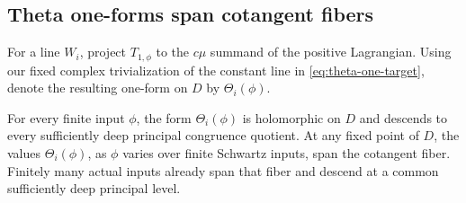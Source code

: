 \subsection{Theta one-forms span cotangent fibers}\label{subsec:theta-one-forms}

For a line \(W_i\), project \(T_{1,\phi}\) to the \(c\mu\)
summand of the positive Lagrangian.  Using our fixed complex
trivialization of the constant line in \eqref{eq:theta-one-target},
denote the resulting one-form on
\(D\) by \(\Theta_i(\phi)\).

\begin{proposition}\label{prop:theta-one}
For every finite input \(\phi\), the form \(\Theta_i(\phi)\) is
holomorphic on \(D\) and descends to every sufficiently deep
principal congruence quotient.  At any fixed point of \(D\), the
values \(\Theta_i(\phi)\), as \(\phi\) varies over finite
Schwartz inputs, span the cotangent fiber.  Finitely many actual
inputs already span that fiber and descend at a common sufficiently
deep principal level.
\end{proposition}

